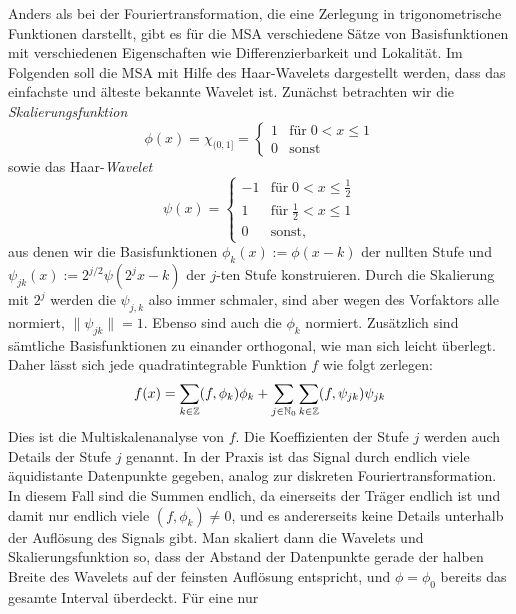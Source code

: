 Anders als bei der Fouriertransformation, die eine Zerlegung in
trigonometrische Funktionen darstellt, gibt es für die MSA
verschiedene Sätze von Basisfunktionen mit verschiedenen Eigenschaften
wie Differenzierbarkeit und Lokalität. Im Folgenden soll die MSA mit
Hilfe des Haar-Wavelets dargestellt werden, dass das einfachste und
älteste bekannte Wavelet ist. Zunächst betrachten wir die
\emph{Skalierungsfunktion}
\begin{equation}
  \phi(x) = \chi_{(0,1]} =
  \begin{cases}
    1 &\text{für}\; 0 < x \le 1\\
    0 &\text{sonst}
  \end{cases}
\end{equation}
sowie das Haar-\emph{Wavelet}
\begin{equation}
  \psi(x) =
  \begin{cases}
    -1 &\text{für}\; 0 < x \le \frac{1}{2}\\
    1 &\text{für}\; \frac{1}{2} < x \le 1 \\
    0 &\text{sonst},
  \end{cases}
\end{equation}
aus denen wir die Basisfunktionen $\phi_k(x) := \phi(x - k)$ der nullten
Stufe und $\psi_{jk}(x) := 2^{j/2}\psi(2^jx-k)$ der $j$-ten Stufe
konstruieren. Durch die Skalierung mit $2^j$ werden die $\psi_{j,k}$
also immer schmaler, sind aber wegen des Vorfaktors alle normiert,
\dh $\lVert \psi_{jk} \rVert = 1$. Ebenso sind auch die $\phi_k$
normiert. Zusätzlich sind sämtliche Basisfunktionen zu einander
orthogonal, wie man sich leicht überlegt. Daher lässt sich jede
quadratintegrable Funktion $f$ wie folgt zerlegen:
\begin{equation}
  f(x) = \sum_{k\in\mathbb{Z}} (f,\phi_k)\phi_k + \sum_{j\in\mathbb{N}_0}
  \sum_{k\in\mathbb{Z}} (f,\psi_{jk})\psi_{jk}
\end{equation}
Dies ist die Multiskalenanalyse von $f$. Die Koeffizienten der Stufe
$j$ werden auch Details der Stufe $j$ genannt. In der Praxis ist das
Signal durch endlich viele äquidistante Datenpunkte gegeben, analog
zur diskreten Fouriertransformation. In diesem Fall sind die Summen
endlich, da einerseits der Träger endlich ist und damit nur endlich
viele $(f,\phi_k)\neq 0$, und es andererseits keine Details unterhalb
der Auflösung des Signals gibt. Man skaliert dann die Wavelets und
Skalierungsfunktion so, dass der Abstand der Datenpunkte gerade der
halben Breite des Wavelets auf der feinsten Auflösung entspricht, und
$\phi = \phi_0$ bereits das gesamte Interval überdeckt. Für eine nur
